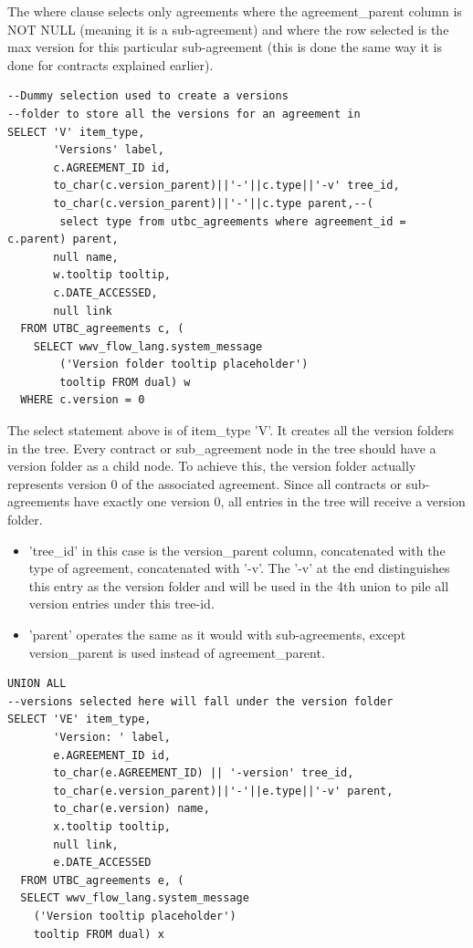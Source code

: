 \documentclass{report}
\begin{document}
The where clause selects only agreements where the agreement\_parent column is NOT NULL (meaning it is a sub-agreement) and where the row selected is the max version for this particular sub-agreement (this is done the same way it is done for contracts explained earlier).

\begin{lstlisting}[caption=Select statement creating a dummy version folder entry in the tree.]
--Dummy selection used to create a versions 
--folder to store all the versions for an agreement in
SELECT 'V' item_type,
       'Versions' label,
       c.AGREEMENT_ID id,
       to_char(c.version_parent)||'-'||c.type||'-v' tree_id,
       to_char(c.version_parent)||'-'||c.type parent,--(
       	select type from utbc_agreements where agreement_id = c.parent) parent,
       null name,
       w.tooltip tooltip,
       c.DATE_ACCESSED,
       null link
  FROM UTBC_agreements c, (
  	SELECT wwv_flow_lang.system_message
		('Version folder tooltip placeholder') 
		tooltip FROM dual) w
  WHERE c.version = 0
\end{lstlisting}

The select statement above is of item\_type 'V'.  It creates all the version folders in the tree.  Every contract or sub\_agreement node in the tree should have a version folder as a child node.  To achieve this, the version folder actually represents version 0 of the associated agreement.  Since all contracts or sub-agreements have exactly one version 0, all entries in the tree will receive a version folder.

\begin{itemize}
	\item 'tree\_id' in this case is the version\_parent column, concatenated with the type of agreement, concatenated with '-v'.  The '-v' at the end distinguishes this entry as the version folder and will be used in the 4th union to pile all version entries under this tree-id.
	\item 'parent' operates the same as it would with sub-agreements, except version\_parent is used instead of agreement\_parent.
\end{itemize}

\begin{lstlisting}[caption=Select statement getting all versions for a particular contract and making them children of the version folder.]
UNION ALL
--versions selected here will fall under the version folder
SELECT 'VE' item_type,
       'Version: ' label,
       e.AGREEMENT_ID id,
       to_char(e.AGREEMENT_ID) || '-version' tree_id,
       to_char(e.version_parent)||'-'||e.type||'-v' parent,
       to_char(e.version) name,
       x.tooltip tooltip,
       null link,
       e.DATE_ACCESSED
  FROM UTBC_agreements e, (
  SELECT wwv_flow_lang.system_message
  	('Version tooltip placeholder') 
	tooltip FROM dual) x
\end{lstlisting}
\end{document}
